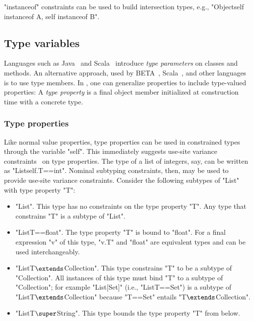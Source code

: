 \xcd"instanceof" constraints can be used to build intersection
types, e.g., \xcd"Object{self instanceof A, self instanceof B}".

\subsection{Type variables}
\label{sec:type-properties}
\label{sec:variance}

Languages such as Java~\cite{Java3} and
Scala~\cite{scala} introduce \emph{type parameters} on classes
and methods.
An alternative approach, used by BETA~\cite{beta}, 
Scala~\cite{scala}, and other languages is to use type members.
In \Xten, one can
generalize properties to include type-valued properties:
A \emph{type property}
is a final object member initialized at construction time with a
concrete type.  

\subsubsection{Type properties}

\label{sec:usability}
\label{sec:parameters-vs-fields}

Like normal value properties, type properties
can be used in constrained types through the variable \xcd"self".
%
This immediately suggests use-site variance
constraints~\cite{unifying-genericity,variant-parametric-types}
on type properties.
The type of a list of integers, say, can be written as
\xcd"List{self.T==int}".  
Nominal subtyping constraints, then, may be used to
provide use-site variance constraints.
%
Consider the following subtypes of \xcd"List" with type property
\xcd"T":
\begin{itemize}
\item \xcd"List".  This type has no constraints on the type
property \xcd"T".
Any type that constrains \xcd"T"
is a subtype of \xcd"List".

\item \xcd"List{T==float}".
The type property \xcd"T" is bound to \xcd"float".
For a final expression \xcd"v" of this type,
\xcd"v.T" and \xcd"float" are equivalent types and can be used
interchangeably.

\item \xcdmath"List{T$\extends$Collection}".
This type constrains \xcd"T" to be a subtype of \xcd"Collection".
All instances of this type must bind \xcd"T" to a subtype of
\xcd"Collection"; for example \xcd"List[Set]" (i.e.,
\xcd"List{T==Set}") is a subtype of
\xcdmath"List{T$\extends$Collection}" because \xcd"T==Set" entails
\xcdmath"T$\extends$Collection".

\item \xcdmath"List{T$\super$String}".  This type bounds the type property
\xcd"T"
from below. 
\end{itemize}

